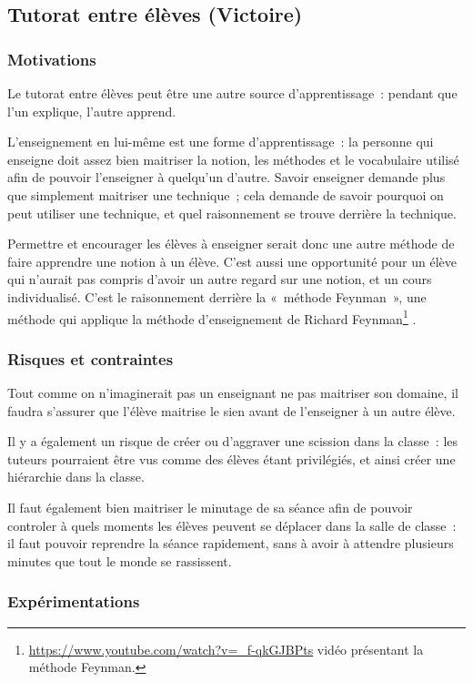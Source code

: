 \subsection{Tutorat entre élèves (Victoire)}
\subsubsection{Motivations}
Le tutorat entre élèves peut être une autre source d'apprentissage : pendant que
l'un explique, l'autre apprend.

L'enseignement en lui-même est une forme d'apprentissage : la personne qui
enseigne doit assez bien maitriser la notion, les méthodes et le vocabulaire
utilisé afin de pouvoir l'enseigner à quelqu'un d'autre. Savoir enseigner
demande plus que simplement maitriser une technique ; cela demande de savoir
pourquoi on peut utiliser une technique, et quel raisonnement se trouve derrière
la technique.

Permettre et encourager les élèves à enseigner serait donc une autre méthode de
faire apprendre une notion à un élève. C'est aussi une opportunité pour un élève
qui n'aurait pas compris d'avoir un autre regard sur une notion, et un cours
individualisé. C'est le raisonnement derrière la « méthode Feynman », une méthode
qui applique la méthode d'enseignement de Richard Feynman\footnote{\url{https://www.youtube.com/watch?v=_f-qkGJBPts} vidéo présentant la méthode Feynman.}
.
\subsubsection{Risques et contraintes}

Tout comme on n'imaginerait pas un enseignant ne pas maitriser son domaine, il
faudra s'assurer que l'élève maitrise le sien avant de l'enseigner à un autre
élève.

Il y a également un risque de créer ou d'aggraver une scission dans la classe :
les tuteurs pourraient être vus comme des élèves étant privilégiés, et ainsi créer
une hiérarchie dans la classe.\cite{pedagogie_cooperative_hierarchie}

Il faut également bien maitriser le minutage de sa séance afin de pouvoir controler
à quels moments les élèves peuvent se déplacer dans la salle de classe : il faut
pouvoir reprendre la séance rapidement, sans à avoir à attendre plusieurs minutes
que tout le monde se rassissent.

\subsubsection{Expérimentations}

